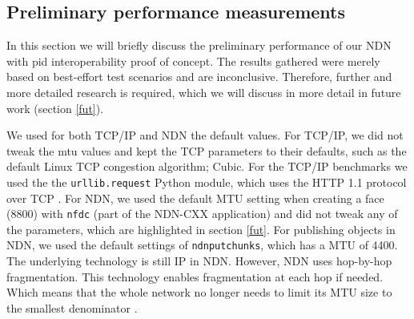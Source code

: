 

\subsection{Preliminary performance measurements}
\label{discussion-performance}
In this section we will briefly discuss the preliminary performance of our NDN with \gls{pid} interoperability proof of concept. The results gathered were merely based on best-effort test scenarios and are inconclusive. Therefore, further and more detailed research is required, which we will discuss in more detail in future work (section \ref{fut}). 


We used for both TCP/IP and NDN the default values.
For TCP/IP, we did not tweak the \gls{mtu} values and kept the TCP parameters to their defaults, such as the default Linux TCP congestion algorithm; Cubic. For the TCP/IP benchmarks we used the the \texttt{urllib.request} Python module, which uses the HTTP 1.1 protocol over TCP \cite{urllib}. For NDN, we used the default MTU setting when creating a face (8800) with \texttt{nfdc} (part of the NDN-CXX application) and did not tweak any of the parameters, which are highlighted in section \ref{fut}. For publishing objects in NDN, we used the default settings of \texttt{ndnputchunks}, which has a MTU of 4400. The underlying technology is still IP in NDN. However, NDN uses hop-by-hop fragmentation. This technology enables fragmentation at each hop if needed. Which means that the whole network no longer needs to limit its MTU size to the smallest denominator \cite{ndn-mtu}.

